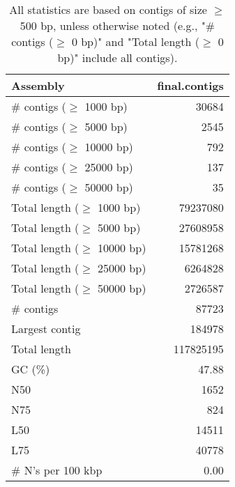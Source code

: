 \documentclass[12pt,a4paper]{article}
\begin{document}
\begin{table}[ht]
\begin{center}
\caption{All statistics are based on contigs of size $\geq$ 500 bp, unless otherwise noted (e.g., "\# contigs ($\geq$ 0 bp)" and "Total length ($\geq$ 0 bp)" include all contigs).}
\begin{tabular}{|l*{1}{|r}|}
\hline
Assembly & final.contigs \\ \hline
\# contigs ($\geq$ 1000 bp) & 30684 \\ \hline
\# contigs ($\geq$ 5000 bp) & 2545 \\ \hline
\# contigs ($\geq$ 10000 bp) & 792 \\ \hline
\# contigs ($\geq$ 25000 bp) & 137 \\ \hline
\# contigs ($\geq$ 50000 bp) & 35 \\ \hline
Total length ($\geq$ 1000 bp) & 79237080 \\ \hline
Total length ($\geq$ 5000 bp) & 27608958 \\ \hline
Total length ($\geq$ 10000 bp) & 15781268 \\ \hline
Total length ($\geq$ 25000 bp) & 6264828 \\ \hline
Total length ($\geq$ 50000 bp) & 2726587 \\ \hline
\# contigs & 87723 \\ \hline
Largest contig & 184978 \\ \hline
Total length & 117825195 \\ \hline
GC (\%) & 47.88 \\ \hline
N50 & 1652 \\ \hline
N75 & 824 \\ \hline
L50 & 14511 \\ \hline
L75 & 40778 \\ \hline
\# N's per 100 kbp & 0.00 \\ \hline
\end{tabular}
\end{center}
\end{table}
\end{document}
